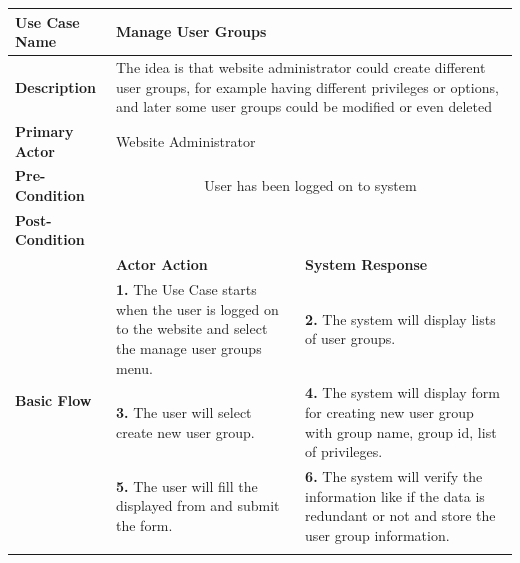 \begin{table}[!h]
\begin{tabular}{|l|p{6cm}|p{6cm}|}
\hline 
\rule[-1ex]{0pt}{2.5ex} \textbf{Use Case Name} & \multicolumn{2}{p{10cm}|}{Manage User Groups} \\ 
\hline 
\rule[-1ex]{0pt}{2.5ex} \textbf{Description} &\multicolumn{2}{p{10cm}|}{The idea is that website administrator could create different user groups, for example having different privileges or options, and later some user groups could be modified or even deleted} \\ 
\hline 
\rule[-1ex]{0pt}{2.5ex} \textbf{Primary Actor}& \multicolumn{2}{p{10cm}|}{Website Administrator} \\ 
\hline 
\rule[-1ex]{0pt}{2.5ex} \textbf{Pre-Condition} & \multicolumn{2}{c|}{User has been logged on to system} \\ 
\hline 
\rule[-1ex]{0pt}{2.5ex} \textbf{Post-Condition} & \multicolumn{2}{p{10cm}|}{}  \\ 
\hline 
\multirow{4}{*}{\textbf{Basic Flow}} & \textbf{Actor Action} & \textbf{System Response}\\
\cline{2-3}
%
&
\textbf{1.}  The Use Case starts when the user is logged on to the website and select the manage user groups menu.
& 
\textbf{2.}  The system will display lists of user groups.
\\
%
&
\textbf{3.}  The user will select create new user group.
& 
\textbf{4.}  The system will display form for creating new user group with group name, group id, list of privileges. 
\\
%
&
\textbf{5.}  The user will fill the displayed from and submit the form.
& 
\textbf{6.}  The system will verify the information like if the data is redundant or not and store the user group information. 
\\
%
&


\end{tabular}
\end{table}
